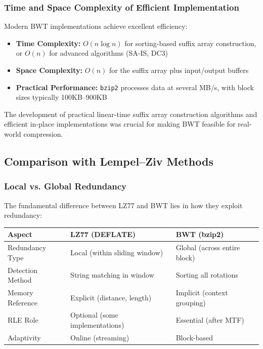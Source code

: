 \subsubsection{Time and Space Complexity of Efficient Implementation}

Modern BWT implementations achieve excellent efficiency:

\begin{itemize}
    \item \textbf{Time Complexity:} \(O(n \log n)\) for sorting-based suffix array construction, or \(O(n)\) for advanced algorithms (SA-IS, DC3)
    \item \textbf{Space Complexity:} \(O(n)\) for the suffix array plus input/output buffers
    \item \textbf{Practical Performance:} \texttt{bzip2} processes data at several MB/s, with block sizes typically 100KB–900KB
\end{itemize}

\begin{importantbox}
The development of practical linear-time suffix array construction algorithms and efficient in-place implementations was crucial for making BWT feasible for real-world compression.
\end{importantbox}

\subsection{Comparison with Lempel--Ziv Methods}

\subsubsection{Local vs. Global Redundancy}

The fundamental difference between LZ77 and BWT lies in how they exploit redundancy:

\begin{center}
\begin{tabularx}{\textwidth}{@{}l X X@{}}
\toprule
\textbf{Aspect} & \textbf{LZ77 (DEFLATE)} & \textbf{BWT (bzip2)} \\
\midrule
Redundancy Type & Local (within sliding window) & Global (across entire block) \\
Detection Method & String matching in window & Sorting all rotations \\
Memory Reference & Explicit (distance, length) & Implicit (context grouping) \\
RLE Role & Optional (some implementations) & Essential (after MTF) \\
Adaptivity & Online (streaming) & Block-based \\
\bottomrule
\end{tabularx}
\end{center}

